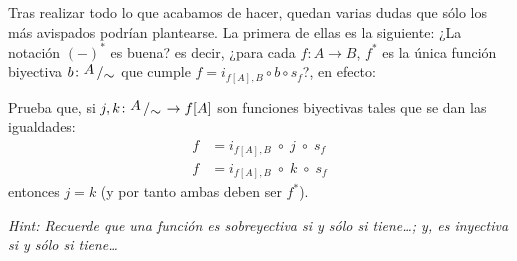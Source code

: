 \documentclass[letterpaper,DIV=14,headsepline,12pt]{scrartcl}
\newcommand{\pts}{}
\newenvironment{ejercicio}[1]{\ifthenelse{\equal{#1}{1} \OR
\equal{#1}{+1}}{\renewcommand{\pts}{\textbf{(#1
pt)}}}{\renewcommand{\pts}{\textbf{(#1 pts)}}}\begin{ejj}\upshape
\pts}{\end{ejj}}
\newcommand{\quot}[2]{{\raisebox{.2em}{$#1$}\left/\raisebox{-.2em}{$#2$}\right.}}
\begin{document}
    Tras realizar todo lo que acabamos de hacer, quedan varias dudas que sólo
    los más avispados podrían plantearse. La primera de ellas es la siguiente:
    ¿La notación $(-)^*$ es buena? es decir, ¿para cada $f\colon A \to B$, $f^*$ es la
    única función biyectiva $b\colon \quot{A}{\sim}$ que cumple $f=i_{f[A],B} \circ b
    \circ s_f$?, en efecto:
    
    \begin{ejercicio}{+2}
        Prueba que, si $j,k\colon \quot{A}{\sim} \to f[A]$ son funciones biyectivas
        tales que se dan las igualdades:
        \begin{align*}
            f & = i_{f[A],B} \; \circ \; j \; \circ \; s_f \\
            f & = i_{f[A],B} \; \circ \; k \; \circ \; s_f
        \end{align*}
        entonces $j=k$ (y por tanto ambas deben ser $f^*$).

        \textit{Hint: Recuerde que una función es sobreyectiva si y sólo si tiene\dots;
        y, es inyectiva si y sólo si tiene\dots}
    \end{ejercicio}
\end{document}
